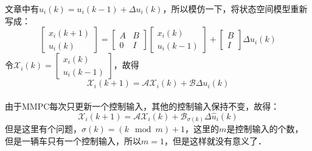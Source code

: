 文章中有$u_{i}(k)=u_{i}(k-1)+\Delta u_{i}(k)$，所以模仿一下，将状态空间模型重新写成：
\begin{equation}
  \begin{bmatrix}
x_{i}(k+1) \\
u_{i}(k)
\end{bmatrix}=\begin{bmatrix}
A  &B\\
 0 &I
\end{bmatrix}\begin{bmatrix}
x_{i}(k) \\
u_{i}(k-1)
\end{bmatrix}+\begin{bmatrix}
B \\
I
\end{bmatrix}\Delta u_{i}(k)
\end{equation}
令$\mathcal{X} _{i}(k)=\begin{bmatrix}
x_{i}(k) \\
u_{i}(k-1)
\end{bmatrix}$，故得
\begin{equation}
\mathcal{X} _{i}(k+1)=\mathcal{A} \mathcal{X}_{i}(k)+\mathcal{B}\Delta u_{i}(k)\end{equation}\\
由于MMPC每次只更新一个控制输入，其他的控制输入保持不变，故得：
\begin{equation}
\mathcal{X} _{i}(k+1)=\mathcal{A} \mathcal{X}_{i}(k)+\mathcal{B}_{\sigma (k)}\Delta \hat{u} _{i}(k)
\end{equation}
但是这里有个问题，$\sigma(k)=(k\mod{m})+1$，这里的$m$是控制输入的个数，但是一辆车只有一个控制输入，所以$m=1$，但是这样就没有意义了．





